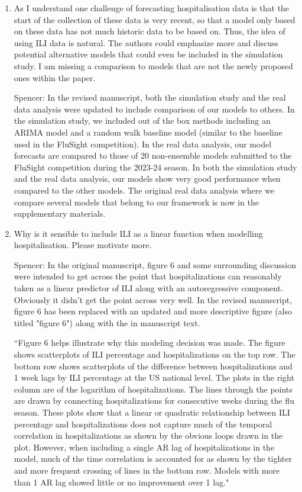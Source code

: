 \documentclass{article}
\newcommand{\spencer}[1]{{\color{blue} Spencer: #1}}
\begin{document}
\begin{enumerate}[1.]
\item As I understand one challenge of forecasting hospitalisation data is that the 
start of the collection of these data is very recent, so that a model only 
based on these data has not much historic data to be based on. Thus, the idea 
of using ILI data is natural. The authors could emphasize more and discuss 
potential alternative models that could even be included in the simulation 
study. I am missing a comparison to models that are not the newly proposed 
ones within the paper.


\spencer{In the revised manuscript, 
both the simulation study and the real data analysis were updated to include
comparison of our models to others. In the simulation study, we included out 
of the box methods including an ARIMA model and a random walk baseline model
(similar to the baseline used in the FluSight competition).
In the real data analysis, our model forecasts are compared to those of 20
non-ensemble models submitted to the FluSight competition during the 2023-24
season. In both the simulation study and the real data analysis, 
our models show very good performance when compared to the other models. 
The original real data analysis where we compare several models that
belong to our framework is now in the supplementary materials.}

\item Why is it sensible to include ILI as a linear function when modelling 
hospitalisation. Please motivate more. 

\spencer{In the original manuscript, figure 6 and some surrounding discussion
were intended to get across the point that hospitalizations can reasonably
taken as a linear predictor of ILI along with an autoregressive component.
Obviously it didn't get the point across very well. 
In the revised manuscript, figure 6 has been replaced with an updated and more
descriptive figure (also titled "figure 6") along with the in manuscript
text.

``Figure 6 helps
illustrate why this modeling decision was made.
The figure shows scatterplots of ILI percentage and 
hospitalizations on the top row.
The bottom row shows scatterplots of the difference between hospitalizations and 
1 week 
lags
by ILI percentage at the US national level. The plots in the right column
are of the logarithm of hospitalizations. The lines through the points are
drawn by connecting hospitalizations for consecutive weeks during the flu 
season.
These plots show that a linear or quadratic relationship between ILI percentage 
and hospitalizations does not capture much of the temporal correlation in 
hospitalizations as shown by the obvious loops drawn in the plot. 
However, when including a 
single AR lag of hospitalizations in the model, much of the time 
correlation is
accounted for as shown by the tighter and more frequent crossing of lines
in the bottom row. Models with more than 1 AR lag showed little or no 
improvement over 1 lag."}


\end{enumerate}
\end{document}
